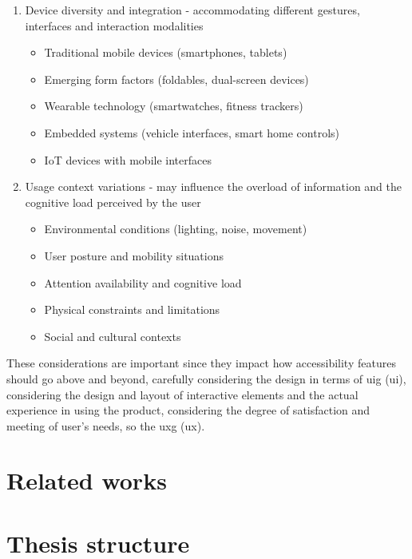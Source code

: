 \begin{enumerate}
    \item Device diversity and integration - accommodating different gestures, interfaces and interaction modalities
        \begin{itemize}
            \item Traditional mobile devices (smartphones, tablets)
            \item Emerging form factors (foldables, dual-screen devices)
            \item Wearable technology (smartwatches, fitness trackers)
            \item Embedded systems (vehicle interfaces, smart home controls)
            \item IoT devices with mobile interfaces
        \end{itemize}
    \item Usage context variations - may influence the overload of information and the cognitive load perceived by the user
        \begin{itemize}
            \item Environmental conditions (lighting, noise, movement)
            \item User posture and mobility situations
            \item Attention availability and cognitive load
            \item Physical constraints and limitations
            \item Social and cultural contexts
        \end{itemize}
\end{enumerate}

These considerations are important since they impact how accessibility features should go above and beyond, carefully considering the design in terms of \gls{uig} (\acrshort{ui}), considering the design and layout of interactive elements and the actual experience in using the product, considering the degree of satisfaction and meeting of user's needs, so the \gls{uxg} (\acrshort{ux}).  

\section{Related works}
\label{chap:intro-related-works}

\section{Thesis structure}
\label{chap:intro-structure} 

